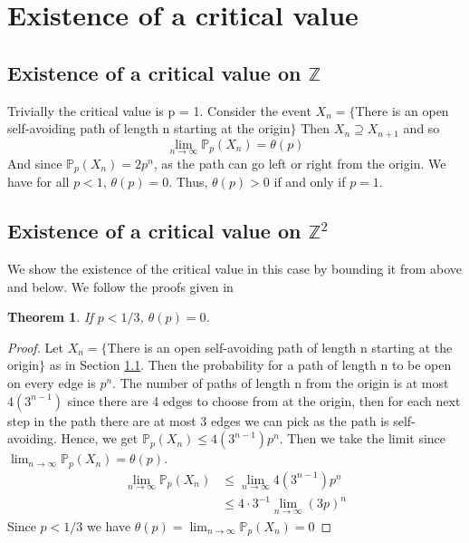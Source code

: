 \documentclass[a4paper,11pt]{article}
\newtheorem{theorem}{Theorem}[section]
\theoremstyle{definition}
\newcommand{\ints}{\mathbb{Z}}
\newcommand{\prob}{\mathbb{P}_p}
\begin{document}
\section{Existence of a critical value}
\subsection {Existence of a critical value on $\ints$}\label{critvalforZ}
Trivially the critical value is p = 1. Consider the event $X_n = \{$There is an open self-avoiding path of length n starting at the origin$\}$ 
Then $X_n \supseteq X_{n+1}$ and so 
$$\lim_{n\rightarrow \infty} \prob (X_n) = \theta(p)$$
And since $\prob (X_n) = 2p^n$, as the path can go left or right from the origin. We have for all $p <1$, $\theta(p) = 0$. Thus, $\theta(p) > 0$ if and only if $p = 1$. 


\subsection {Existence of a critical value on $\ints^2$}
We show the existence of the critical value in this case by bounding it from above and below. We follow the proofs given in \cite{steif2011mini}
\begin{theorem}
	If $p < 1/3$, $\theta(p) = 0$.
\end{theorem}
\begin{proof}
	Let $X_n = \{$There is an open self-avoiding path of length n starting at the origin$\}$ as in Section \ref{critvalforZ}.
	Then the probability for a path of length n to be open on every edge is $p^n$. The number of paths of length n from the origin is at most $4(3^{n-1})$ since there are 4 edges to choose from at the origin, then for each next step in the path there are at most 3 edges we can pick as the path is self-avoiding.
	Hence, we get $\prob(X_n) \leq  4(3^{n-1})p^n  $. Then we take the limit since
	$\lim_{n\rightarrow \infty}\prob(X_n) = \theta(p)$.
	\begin{align*}
		\lim_{n\rightarrow \infty}\prob(X_n) &\leq  \lim_{n\rightarrow \infty}4(3^{n-1})p^n\\
		 &\leq 4\cdot  3^{-1} \lim_{n\rightarrow \infty}(3p)^{n}
	 \end{align*}
	 Since $p < 1/3$ we have $\theta(p)=\lim_{n\rightarrow \infty}\prob(X_n) = 0$
\end{proof}
\end{document}
